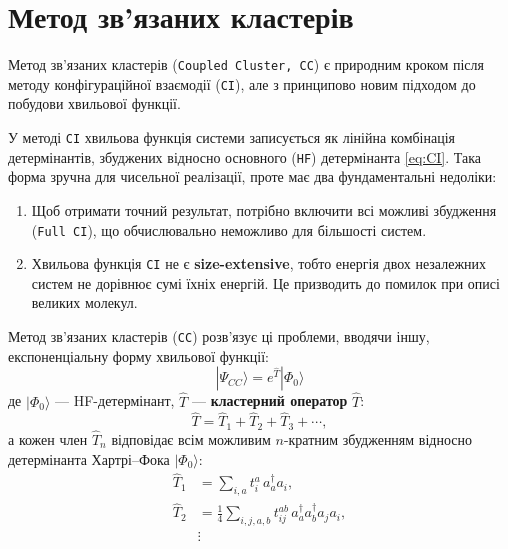 

\section{Метод зв’язаних кластерів}

Метод зв'язаних кластерів (\texttt{Coupled Cluster, CC}) є природним кроком після методу
конфігураційної взаємодії (\texttt{CI}), але з принципово новим підходом
до побудови хвильової функції.

У методі \texttt{CI} хвильова функція системи записується як лінійна комбінація
детермінантів, збуджених відносно основного (\texttt{HF}) детермінанта \eqref{eq:CI}.
Така форма зручна для чисельної реалізації, проте має два
фундаментальні недоліки:
\begin{enumerate}
    \item Щоб отримати точний результат, потрібно включити всі можливі
    збудження (\texttt{Full CI}), що обчислювально неможливо для більшості систем.
    \item Хвильова функція \texttt{CI} не є \textbf{size-extensive}, тобто енергія двох незалежних систем
    не дорівнює сумі їхніх енергій. Це призводить до помилок при описі
    великих молекул.
\end{enumerate}

Метод зв'язаних кластерів (\texttt{CC}) розв'язує ці проблеми, вводячи іншу,
експоненціальну форму хвильової функції:
\begin{equation}\label{eq:CC}
    |\Psi_{CC}\rangle = e^{\hat{T}} |\Phi_0\rangle
\end{equation}
де $|\Phi_0\rangle$ --- HF-детермінант, $\hat{T}$ --- \textbf{кластерний оператор} $\hat{T}$:
\begin{equation}
    \hat{T} = \hat{T}_1 + \hat{T}_2 + \hat{T}_3 + \cdots,
\end{equation}
а кожен член \(\hat{T}_n\) відповідає всім можливим \(n\)-кратним збудженням
відносно детермінанта Хартрі–Фока $|\Phi_0\rangle$:
\begin{align}
    \hat{T}_1 &= \sum_{i,a} t_i^a\, a_a^\dagger a_i, \\
    \hat{T}_2 &= \frac{1}{4} \sum_{i,j,a,b} t_{ij}^{ab}\, a_a^\dagger a_b^\dagger a_j a_i, \\
    &\vdots
\end{align}

